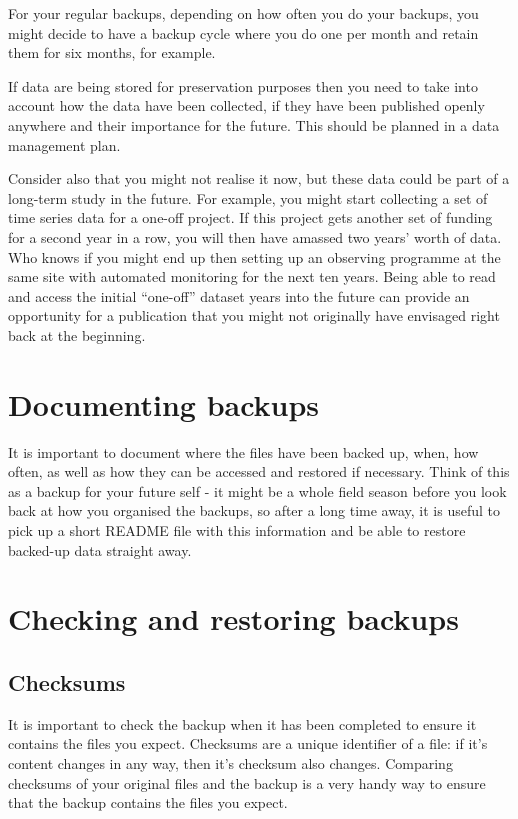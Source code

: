 \documentclass[12pt,a4paper,oneside]{report}
\begin{document}
For your regular backups, depending on how often you do your backups,
you might decide to have a backup cycle where you do one per month and
retain them for six months, for example.

If data are being stored for preservation purposes then you need to take
into account how the data have been collected, if they have been
published openly anywhere and their importance for the future. This
should be planned in a data management plan.

Consider also that you might not realise it now, but these data could be
part of a long-term study in the future. For example, you might start
collecting a set of time series data for a one-off project. If this
project gets another set of funding for a second year in a row, you will
then have amassed two years' worth of data. Who knows if you might end
up then setting up an observing programme at the same site with
automated monitoring for the next ten years. Being able to read and
access the initial ``one-off'' dataset years into the future can provide
an opportunity for a publication that you might not originally have
envisaged right back at the beginning.

\hypertarget{documenting-backups}{%
\section{Documenting backups}\label{documenting-backups}}

It is important to document where the files have been backed up, when,
how often, as well as how they can be accessed and restored if
necessary. Think of this as a backup for your future self - it might be
a whole field season before you look back at how you organised the
backups, so after a long time away, it is useful to pick up a short
README file with this information and be able to restore backed-up data
straight away.

\hypertarget{checking-and-restoring-backups}{%
\section{Checking and restoring
backups}\label{checking-and-restoring-backups}}

\hypertarget{checksums}{%
\subsection{Checksums}\label{checksums}}

It is important to check the backup when it has been completed to ensure
it contains the files you expect. Checksums are a unique identifier of a
file: if it's content changes in any way, then it's checksum also
changes. Comparing checksums of your original files and the backup is a
very handy way to ensure that the backup contains the files you expect.
\end{document}
